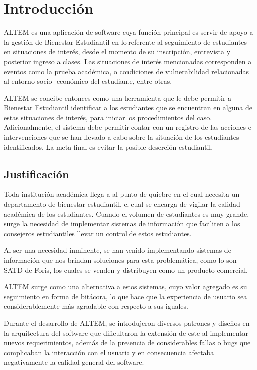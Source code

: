 \chapter{Introducci\'on}
ALTEM es una aplicación de software cuya función principal es servir de apoyo a la gestión de Bienestar Estudiantil en lo referente al seguimiento de estudiantes en situaciones de interés, desde el momento de su inscripción, entrevista y posterior ingreso a clases. Las situaciones de interés mencionadas corresponden a eventos como la prueba académica, o condiciones de vulnerabilidad relacionadas al entorno socio- económico del estudiante, entre otras.

ALTEM se concibe entonces como una herramienta que le debe permitir a Bienestar Estudiantil identificar a los estudiantes que se encuentran en alguna de estas situaciones de interés, para iniciar los procedimientos del caso. Adicionalmente, el sistema debe permitir contar con un registro de las acciones e intervenciones que se han llevado a cabo sobre la situación de los estudiantes identificados. La meta final es evitar la posible deserción estudiantil.

\section{Justificación}
Toda institución académica llega a al punto de quiebre en el cual necesita un departamento de bienestar estudiantil, el cual se encarga de vigilar la calidad académica de los estudiantes. Cuando el volumen de estudiantes es muy grande, surge la necesidad de implementar sistemas de información que faciliten a los consejeros estudiantiles llevar un control de estos estudiantes. 

Al ser una necesidad inminente, se han venido implementando sistemas de información que nos brindan soluciones para esta problemática, como lo son SATD de Foris, los cuales se venden y distribuyen como un producto comercial.

ALTEM surge como una alternativa a estos sistemas, cuyo valor agregado es su seguimiento en forma de bitácora, lo que hace que la experiencia de usuario sea considerablemente más agradable con respecto a sus iguales.

Durante el desarrollo de ALTEM, se introdujeron diversos patrones y diseños en la arquitectura del software que dificultaron la extensión de este al implementar nuevos requerimientos, además de la presencia de considerables fallas o bugs que complicaban la interacción con el usuario y en consecuencia afectaba negativamente la calidad general del software.


